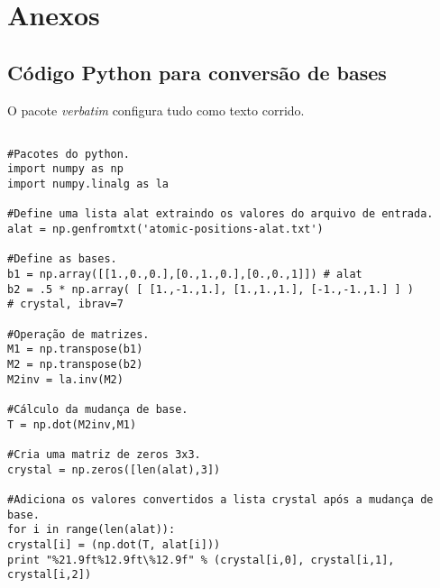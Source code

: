 \chapter*{Anexos}
\label{anexo:refinamentos}

\renewcommand\thesection{A}

\section{Código Python para conversão de bases}
\label{Python-Conversão de bases}

O pacote \textit{verbatim} configura tudo como texto corrido.

\begin{verbatim}

#Pacotes do python.
import numpy as np
import numpy.linalg as la

#Define uma lista alat extraindo os valores do arquivo de entrada.
alat = np.genfromtxt('atomic-positions-alat.txt')

#Define as bases.
b1 = np.array([[1.,0.,0.],[0.,1.,0.],[0.,0.,1]]) # alat
b2 = .5 * np.array( [ [1.,-1.,1.], [1.,1.,1.], [-1.,-1.,1.] ] ) 
# crystal, ibrav=7

#Operação de matrizes.
M1 = np.transpose(b1)
M2 = np.transpose(b2)
M2inv = la.inv(M2)

#Cálculo da mudança de base.
T = np.dot(M2inv,M1)

#Cria uma matriz de zeros 3x3.
crystal = np.zeros([len(alat),3])

#Adiciona os valores convertidos a lista crystal após a mudança de base.
for i in range(len(alat)):
crystal[i] = (np.dot(T, alat[i]))
print "%21.9ft%12.9ft\%12.9f" % (crystal[i,0], crystal[i,1], crystal[i,2])
\end{verbatim}
